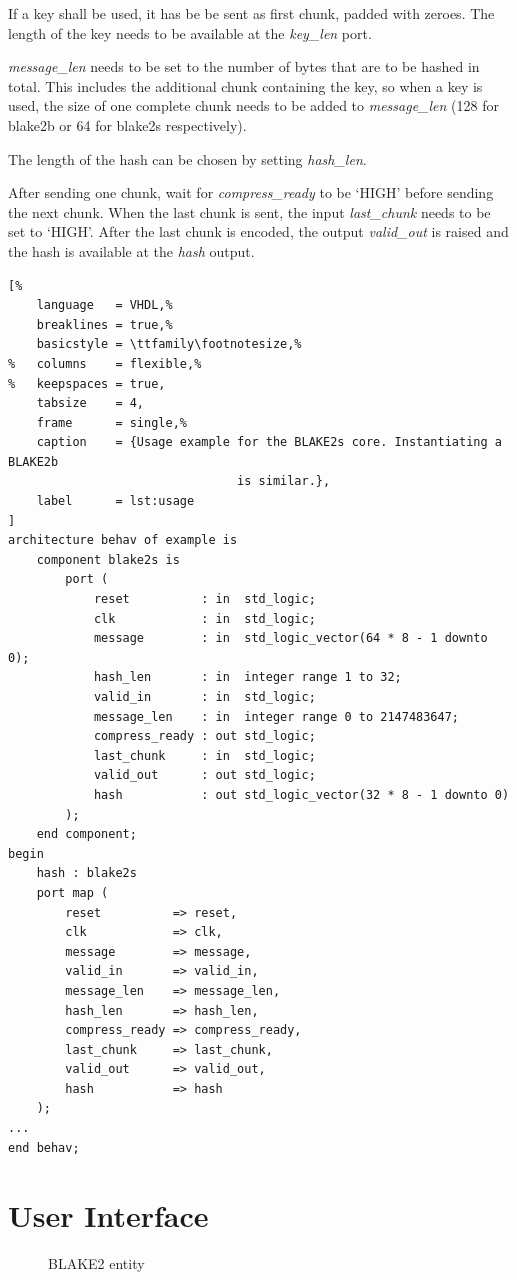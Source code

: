 \documentclass[%
	a4paper,
]
{article}
\begin{document}
If a key shall be used, it has be be sent as first chunk, padded with zeroes.
The length of the key needs to be available at the \emph{key_len} port.

\emph{message_len} needs to be set to the number of bytes that are to be
hashed in total. This includes the additional chunk containing the key, so when
a key is used, the size of one complete chunk needs to be added to
\emph{message_len} (128 for blake2b or 64 for blake2s respectively).

The length of the hash can be chosen by setting
\emph{hash_len}.

After sending one chunk, wait for \emph{compress_ready} to be `HIGH' before
sending the next chunk. When the last chunk is sent, the input
\emph{last_chunk} needs to be set to `HIGH'. After the last chunk is
encoded, the output \emph{valid_out} is raised and the hash is available at the
\emph{hash} output.

\begin{lstlisting}[%
	language   = VHDL,%
	breaklines = true,%
	basicstyle = \ttfamily\footnotesize,%
%	columns    = flexible,%
%	keepspaces = true,
	tabsize    = 4,
	frame      = single,%
	caption    = {Usage example for the BLAKE2s core. Instantiating a BLAKE2b
								is similar.},
	label      = lst:usage
]
architecture behav of example is
	component blake2s is
		port (
			reset          : in  std_logic;
			clk            : in  std_logic;
			message        : in  std_logic_vector(64 * 8 - 1 downto 0);
			hash_len       : in  integer range 1 to 32;
			valid_in       : in  std_logic;
			message_len    : in  integer range 0 to 2147483647;
			compress_ready : out std_logic;
			last_chunk     : in  std_logic;
			valid_out      : out std_logic;
			hash           : out std_logic_vector(32 * 8 - 1 downto 0)
		);
	end component;
begin
	hash : blake2s
	port map (
		reset          => reset,
		clk            => clk,
		message        => message,
		valid_in       => valid_in,
		message_len    => message_len,
		hash_len       => hash_len,
		compress_ready => compress_ready,
		last_chunk     => last_chunk,
		valid_out      => valid_out,
		hash           => hash
	);
...
end behav;
\end{lstlisting}
%
%
\section{User Interface}
\label{sec:user-interface}
%

\begin{figure}[h!]
	\centering
	\small
	
	\caption{BLAKE2 entity}
	\label{fig:blake-entity}
\end{figure}
\end{document}
